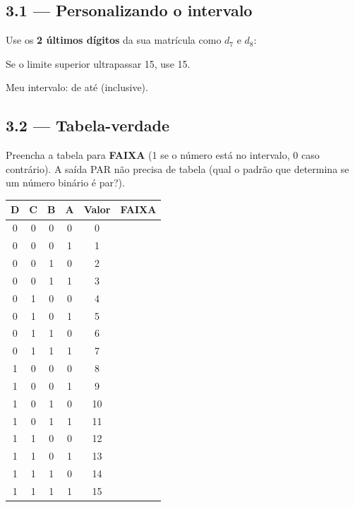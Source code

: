 \documentclass[12pt,a4paper]{article}
\newcommand{\resplinha}[1][4cm]{\underline{\hspace{#1}}}
\newcommand{\celula}{\rule{0pt}{14pt}\hspace{12pt}}
\begin{document}
\subsection{3.1 --- Personalizando o intervalo}

Use os \textbf{2 últimos dígitos} da sua matrícula como $d_7$ e $d_8$:

\begin{center}
\end{center}

\noindent Se o limite superior ultrapassar 15, use 15.

\vspace{4pt}
\noindent Meu intervalo: de \resplinha[1.5cm] até \resplinha[1.5cm] (inclusive).

\subsection{3.2 --- Tabela-verdade}

Preencha a tabela para \textbf{FAIXA} (1 se o número está no intervalo, 0 caso contrário).
A saída PAR não precisa de tabela (qual o padrão que determina se um número binário é par?).

\begin{center}
\begin{tabular}{cccc|c|c}
\toprule
\textbf{D} & \textbf{C} & \textbf{B} & \textbf{A} & \textbf{Valor} & \textbf{FAIXA} \\
\midrule
0 & 0 & 0 & 0 & 0  & \celula \\
0 & 0 & 0 & 1 & 1  & \celula \\
0 & 0 & 1 & 0 & 2  & \celula \\
0 & 0 & 1 & 1 & 3  & \celula \\
0 & 1 & 0 & 0 & 4  & \celula \\
0 & 1 & 0 & 1 & 5  & \celula \\
0 & 1 & 1 & 0 & 6  & \celula \\
0 & 1 & 1 & 1 & 7  & \celula \\
1 & 0 & 0 & 0 & 8  & \celula \\
1 & 0 & 0 & 1 & 9  & \celula \\
1 & 0 & 1 & 0 & 10 & \celula \\
1 & 0 & 1 & 1 & 11 & \celula \\
1 & 1 & 0 & 0 & 12 & \celula \\
1 & 1 & 0 & 1 & 13 & \celula \\
1 & 1 & 1 & 0 & 14 & \celula \\
1 & 1 & 1 & 1 & 15 & \celula \\
\bottomrule
\end{tabular}
\end{center}
\end{document}
